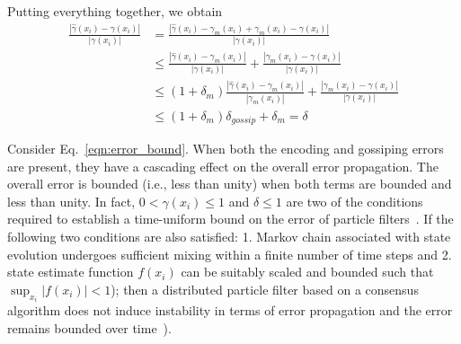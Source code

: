 \documentclass[10pt,letterpaper,final]{article}
\begin{document}

Putting everything together, we obtain
\begin{align}
\frac{|\hat{\gamma}(x_i) - \gamma(x_i)|}{|\gamma(x_i)|}&=\frac{|\hat{\gamma}(x_i) -\gamma_m(x_i) + \gamma_m(x_i) - \gamma(x_i)|}{|\gamma(x_i)|} \\
&\leq \frac{|\hat{\gamma}(x_i) -\gamma_m(x_i)|}{|\gamma(x_i)|}+\frac{|\gamma_m(x_i) - \gamma(x_i)|}{|\gamma(x_i)|} \\
&\leq (1+\delta_m)\frac{|\hat{\gamma}(x_i) -\gamma_m(x_i)|}{|\gamma_m(x_i)|}+\frac{|\gamma_m(x_i) - \gamma(x_i)|}{|\gamma(x_i)|} \\
&\leq (1+\delta_m)\delta_{gossip} + \delta_m  = \delta
\label{eqn:error_bound}
\end{align}

Consider Eq.~\eqref{eqn:error_bound}. When both the encoding and gossiping errors are present, they have a cascading effect on the overall error propagation. The overall error is bounded (i.e., less than unity) when both terms are bounded and less than unity. In fact, $0<\gamma(x_i)\leq 1$ and $\delta\leq 1$ are two of the conditions required to establish a time-uniform bound on the error of particle filters~\cite{Syamantak2015}. If the following two conditions are also satisfied: 1. Markov chain associated with state evolution undergoes sufficient mixing within a finite number of time steps and 2. state estimate function $f(x_i)$ can be suitably scaled and bounded such that $\sup_{x_i} |f(x_i)|<1$); then a distributed particle filter based on a consensus algorithm does not induce instability in terms of error propagation and the error remains bounded over time~\cite{Syamantak2015}).
\end{document}
